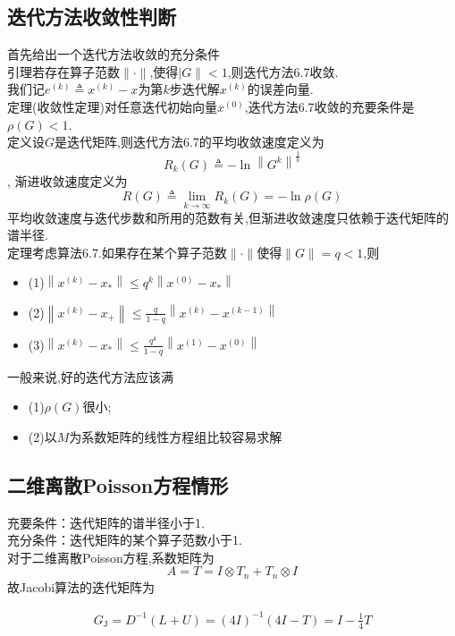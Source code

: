 \documentclass[12pt,a4paper]{article}
\begin{document}
\subsection*{迭代方法收敛性判断}
首先给出一个迭代方法收敛的充分条件\\
{\color{blue}引理}若存在算子范数$\|\cdot\|$,使得$| G \|<1$,则迭代方法6.7收敛.\\
我们记$e^{(k)} \triangleq x^{(k)}-x$为第$k$步迭代解$x^{(k)}$的{\color{blue}误差向量}.\\
{\color{blue}定理(收敛性定理)}对任意迭代初始向量$x^{(0)}$,迭代方法6.7收敛的充要条件是$\rho(G)<1$.\\
{\color{blue}定义}设$G$是迭代矩阵,则迭代方法6.7的{\color{blue}平均收敛速度}定义为
$$
R_{k}(G) \triangleq-\ln \left\|G^{k}\right\|^{\frac{1}{k}}
$$,
{\color{blue}渐进收敛速度}定义为
$$
R(G) \triangleq \lim _{k \rightarrow \infty} R_{k}(G)=-\ln \rho(G)
$$
平均收敛速度与迭代步数和所用的范数有关,但渐进收敛速度只依赖于迭代矩阵的谱半径.\\
{\color{blue}定理}考虑算法6.7.如果存在某个算子范数$\|\cdot\|$使得$\|G\|=q<1$,则
\begin{itemize}
\item (1)$\left\|x^{(k)}-x_{*}\right\| \leq q^{k}\left\|x^{(0)}-x_{*}\right\|$
\item (2)$\left\|x^{(k)}-x_{+}\right\| \leq \frac{q}{1-q}\left\|x^{(k)}-x^{(k-1)}\right\|$
\item (3)$\left\|x^{(k)}-x_{*}\right\| \leq \frac{q^{k}}{1-q}\left\|x^{(1)}-x^{(0)}\right\|$
\end{itemize}
一般来说,好的迭代方法应该满
\begin{itemize}
\item(1)$\rho(G)$很小;
\item(2)以$M$为系数矩阵的线性方程组比较容易求解
\end{itemize}
\subsection{\color{blue}二维离散Poisson方程情形}
{\color{blue}充要条件}：迭代矩阵的谱半径小于1.\\
{\color{blue}充分条件}：迭代矩阵的某个算子范数小于1.\\
对于二维离散Poisson方程,系数矩阵为
$$
A=T=I \otimes T_{n}+T_{n} \otimes I
$$
故Jacobi算法的迭代矩阵为

\begin{align*}
G_{\mathrm{J}}=D^{-1}(L+U)=(4 I)^{-1}(4 I-T)=I-\frac{1}{4} T
\tag {6.12}
\end{align*}
\end{document}
